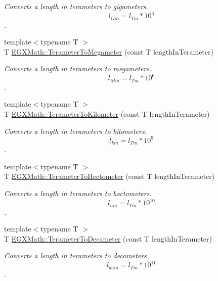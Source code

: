 \begin{DoxyCompactItemize}
\begin{DoxyCompactList}\small\item\em Converts a length in terameters to gigameters. \[ l_{Gm}=l_{Tm} * 10^{3} \]. \end{DoxyCompactList}\item 
{\footnotesize template$<$typename T $>$ }\\T \mbox{\hyperlink{group___e_g_x_math-_conversions-_length_conversions-_s_i-_terameter-_s_i_gad4a32011802c13e60cc98081113d52c1}{E\+G\+X\+Math\+::\+Terameter\+To\+Megameter}} (const T length\+In\+Terameter)
\begin{DoxyCompactList}\small\item\em Converts a length in terameters to megameters. \[ l_{Mm}=l_{Tm} * 10^{6} \]. \end{DoxyCompactList}\item 
{\footnotesize template$<$typename T $>$ }\\T \mbox{\hyperlink{group___e_g_x_math-_conversions-_length_conversions-_s_i-_terameter-_s_i_ga3621654052e072519227ad628e03d68b}{E\+G\+X\+Math\+::\+Terameter\+To\+Kilometer}} (const T length\+In\+Terameter)
\begin{DoxyCompactList}\small\item\em Converts a length in terameters to kilometers. \[ l_{km}=l_{Tm} * 10^{9} \]. \end{DoxyCompactList}\item 
{\footnotesize template$<$typename T $>$ }\\T \mbox{\hyperlink{group___e_g_x_math-_conversions-_length_conversions-_s_i-_terameter-_s_i_ga8e0944895887a45b1e2218ae7a511e4f}{E\+G\+X\+Math\+::\+Terameter\+To\+Hectometer}} (const T length\+In\+Terameter)
\begin{DoxyCompactList}\small\item\em Converts a length in terameters to hectometers. \[ l_{hm}=l_{Tm} * 10^{10} \]. \end{DoxyCompactList}\item 
{\footnotesize template$<$typename T $>$ }\\T \mbox{\hyperlink{group___e_g_x_math-_conversions-_length_conversions-_s_i-_terameter-_s_i_gae7e3fac4aa8882fee314a52fb4466fd2}{E\+G\+X\+Math\+::\+Terameter\+To\+Decameter}} (const T length\+In\+Terameter)
\begin{DoxyCompactList}\small\item\em Converts a length in terameters to decameters. \[ l_{dam}=l_{Tm} * 10^{11} \]. \end{DoxyCompactList}\item 

\end{DoxyCompactItemize}
